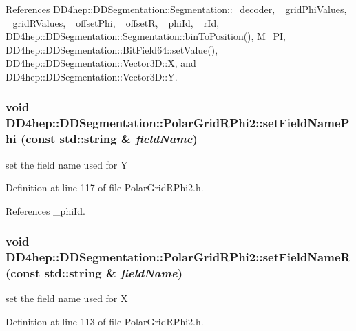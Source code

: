 References DD4hep::DDSegmentation::Segmentation::\_\-decoder, \_\-gridPhiValues, \_\-gridRValues, \_\-offsetPhi, \_\-offsetR, \_\-phiId, \_\-rId, DD4hep::DDSegmentation::Segmentation::binToPosition(), M\_\-PI, DD4hep::DDSegmentation::BitField64::setValue(), DD4hep::DDSegmentation::Vector3D::X, and DD4hep::DDSegmentation::Vector3D::Y.\hypertarget{class_d_d4hep_1_1_d_d_segmentation_1_1_polar_grid_r_phi2_a6cd00f3574bc968232a95d1204238c14}{
\subsubsection[{setFieldNamePhi}]{\setlength{\rightskip}{0pt plus 5cm}void DD4hep::DDSegmentation::PolarGridRPhi2::setFieldNamePhi (const std::string \& {\em fieldName})}}
\label{class_d_d4hep_1_1_d_d_segmentation_1_1_polar_grid_r_phi2_a6cd00f3574bc968232a95d1204238c14}


set the field name used for Y 

Definition at line 117 of file PolarGridRPhi2.h.

References \_\-phiId.\hypertarget{class_d_d4hep_1_1_d_d_segmentation_1_1_polar_grid_r_phi2_aac669f48623b5176e941a1e66fde5877}{
\subsubsection[{setFieldNameR}]{\setlength{\rightskip}{0pt plus 5cm}void DD4hep::DDSegmentation::PolarGridRPhi2::setFieldNameR (const std::string \& {\em fieldName})}}
\label{class_d_d4hep_1_1_d_d_segmentation_1_1_polar_grid_r_phi2_aac669f48623b5176e941a1e66fde5877}


set the field name used for X 

Definition at line 113 of file PolarGridRPhi2.h.

